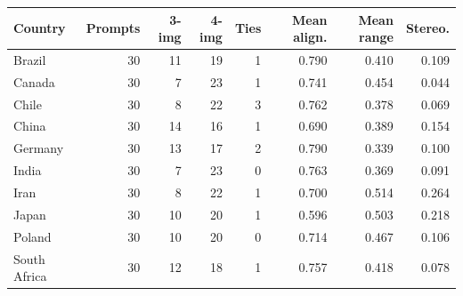 

\footnotesize
\begin{tabular*}{\textwidth}{@{\extracolsep{\fill}}lrrrrrrr}
\toprule
Country & Prompts & 3-img & 4-img & Ties & Mean align. & Mean range & Stereo.\\
\midrule
Brazil & 30 & 11 & 19 & 1 & 0.790 & 0.410 & 0.109\\
Canada & 30 & 7 & 23 & 1 & 0.741 & 0.454 & 0.044\\
Chile & 30 & 8 & 22 & 3 & 0.762 & 0.378 & 0.069\\
China & 30 & 14 & 16 & 1 & 0.690 & 0.389 & 0.154\\
Germany & 30 & 13 & 17 & 2 & 0.790 & 0.339 & 0.100\\
India & 30 & 7 & 23 & 0 & 0.763 & 0.369 & 0.091\\
Iran & 30 & 8 & 22 & 1 & 0.700 & 0.514 & 0.264\\
Japan & 30 & 10 & 20 & 1 & 0.596 & 0.503 & 0.218\\
Poland & 30 & 10 & 20 & 0 & 0.714 & 0.467 & 0.106\\
South Africa & 30 & 12 & 18 & 1 & 0.757 & 0.418 & 0.078\\
\bottomrule
\end{tabular*}
